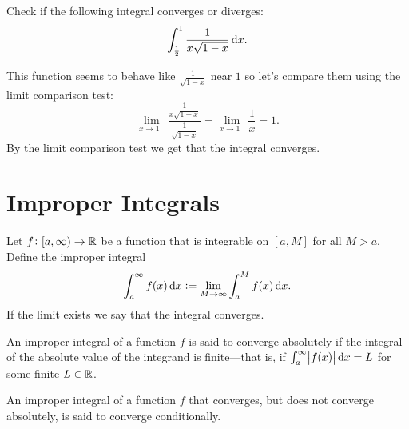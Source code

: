 \documentclass[11pt,a4paper]{article}
\begin{document}
  \begin{exercise}
    Check if the following integral converges or diverges:
    \[
      \int_{\frac{1}{2}}^{1} \frac{1}{x \sqrt{1-x}} \dx.
    \]
  \end{exercise}
  \begin{solution}
    This function seems to behave like $\frac{1}{\sqrt{1-x}}$ near $1$
    so let's compare them using the limit comparison test:
    \[
      \lim_{x\to 1^-} \frac{\frac{1}{x\sqrt{1-x}}}{\frac{1}{\sqrt{1-x}}}
      = \lim_{x\to 1^-}{\frac{1}{x}} = 1.
    \]
    By the limit comparison test we get that the integral converges.
  \end{solution}
	
	\newpage

  \section{Improper Integrals}
  \begin{definition}
    Let $f \colon [a,\infty) \to \mathbb{R}$ be a function that is integrable on
    $[a,M]$ for all $M > a$. Define the improper integral
    \[
      \int_{a}^{\infty} f(x) \dx :=
      \lim_{M \to \infty} \int_{a}^{M} f(x) \dx.
    \]
    If the limit exists we say that the integral converges.
  \end{definition}
  
  \begin{definition}
    An improper integral of a function $f$ is said to converge absolutely 
    if the integral of the absolute value of the integrand is finite---that is,
    if $\int_a^\infty \abs{f(x)}\dx = L$ for some finite $L \in \mathbb{R}$.
  \end{definition}
  \begin{remark}
    An improper integral of a function $f$ that converges, but does not
    converge absolutely, is said to converge conditionally.
  \end{remark}
\end{document}
